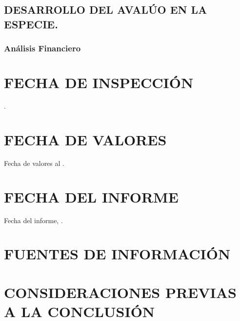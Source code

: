 \documentclass[10pt,letter]{report}
\begin{document}
\setcounter{section}{11}

\subsection{DESARROLLO DEL AVAL\'UO EN LA ESPECIE.}\label{sec:k2}

\subsubsection{An\'alisis Financiero}


\espacio{1cm}

\section{FECHA DE INSPECCI\'ON}\label{sec:l}
\fechaInspeccion.

\section{FECHA DE VALORES}\label{sec:m}
Fecha de valores al \fechaValores.

\section{FECHA DEL INFORME}\label{sec:n}
Fecha del informe, \fechaInforme.

\section{FUENTES DE INFORMACI\'ON}\label{sec:nn}
\begin{itemize}
	
\end{itemize}
\section{CONSIDERACIONES PREVIAS A LA CONCLUSI\'ON}\label{sec:o}

\end{document}
